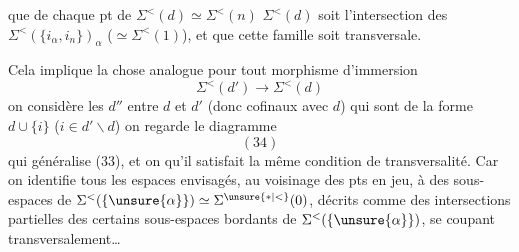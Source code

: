 que  de chaque pt de $\Sigma^{<}(d)\simeq\Sigma^{<}(n)$ $\Sigma^{<}(d)$ soit l'intersection  des $\Sigma^{<}(\{i_\alpha,i_n\})_\alpha$ ($\simeq\Sigma^{<}(1)$), et que cette famille soit transversale.

Cela implique la chose analogue pour tout morphisme d'immersion
\[
\Sigma^{<}(d')\longrightarrow\Sigma^{<}(d)
\]
on considère les $d''$ entre $d$ et $d'$ (donc cofinaux avec $d$) qui sont de la forme $d\cup\{i\}$ ($i\in d'\smallsetminus d$) on regarde le diagramme
\[
(34)
\]
qui généralise (33), et on  qu'il satisfait la même condition de transversalité. Car on identifie tous les espaces envisagés, au voisinage des pts en jeu, à des sous-espaces de $\Sigma^{<}(\{\unsure{\alpha}\})\simeq\Sigma^{\unsure{*|<}}(0)$, décrits  comme des intersections partielles des certains sous-espaces bordants de $\Sigma^{<}(\{\unsure{\alpha}\})$, se coupant transversalement\ldots
{}
